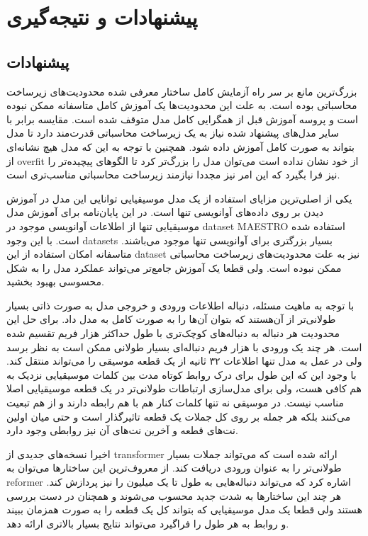 \chapter{پیشنهادات و نتیجه‌گیری}
\section{پیشنهادات}
بزرگ‌ترین مانع بر سر راه آزمایش کامل ساختار معرفی شده محدودیت‌های زیرساخت
محاسباتی بوده است. به علت این محدودیت‌ها یک آموزش کامل متاسفانه ممکن نبوده است و
پروسه آموزش قبل از همگرایی کامل مدل متوقف شده است. مقایسه برابر با سایر مدل‌های
پیشنهاد شده نیاز به یک زیرساخت محاسباتی قدرت‌مند دارد تا مدل بتواند به صورت کامل
آموزش داده شود. همچنین با توجه به این که مدل هیچ نشانه‌ای از \gls{overfit} از
خود نشان نداده است می‌توان مدل را بزرگ‌تر کرد تا الگوهای پیچیده‌تر را نیز فرا
بگیرد که این امر نیز مجددا نیازمند زیرساخت محاسباتی مناسب‌تری است.

یکی از اصلی‌ترین مزایای استفاده از یک مدل موسیقیایی توانایی این مدل در آموزش
دیدن بر روی داده‌های آوانویسی تنها است. در این پایان‌نامه برای آموزش مدل
موسیقیایی تنها از اطلاعات آوانویسی موجود در \gls{dataset} MAESTRO استفاده شده
است. با این وجود \glspl{dataset} بسیار بزرگتری برای آوانویسی تنها موجود
می‌باشند. متاسفانه امکان استفاده از این \gls{dataset} نیز به علت محدودیت‌های
زیرساخت محاسباتی ممکن نبوده است. ولی قطعا یک آموزش جامع‌تر می‌تواند عملکرد مدل
را به شکل محسوسی بهبود بخشید.

با توجه به ماهیت مسئله، دنباله اطلاعات ورودی و خروجی مدل به صورت ذاتی بسیار
طولانی‌تر از آن‌هستند که بتوان آن‌ها را به صورت کامل به مدل داد. برای حل این
محدودیت هر دنباله به دنباله‌های کوچک‌تری با طول حداکثر هزار فریم تقسیم شده است.
هر چند یک ورودی با هزار فریم دنباله‌ای بسیار طولانی ممکن است به نظر برسد ولی در
عمل به مدل تنها اطلاعات ۳۲ ثانیه از یک قطعه موسیقی را می‌تواند منتقل کند. با
وجود این که این طول برای درک روابط کوتاه مدت بین کلمات موسیقیایی نزدیک به هم
کافی هست، ولی برای مدل‌سازی ارتباطات طولانی‌تر در یک قطعه موسیقیایی اصلا مناسب
نیست. در موسیقی نه تنها کلمات کنار هم با هم رابطه دارند و از هم تبعیت می‌کنند
بلکه هر جمله بر روی کل جملات یک قطعه تاثیرگذار است و حتی میان اولین نت‌های قطعه
و آخرین نت‌های آن نیز روابطی وجود دارد.

اخیرا نسخه‌های جدیدی از \gls{transformer} ارائه شده است که می‌تواند جملات بسیار
طولانی‌تر را به عنوان ورودی دریافت کند. از معروف‌ترین این ساختارها می‌توان به
reformer \cite{kitaev2020reformer} اشاره کرد که می‌تواند دنباله‌هایی به طول تا
یک میلیون را نیز پردازش کند. هر چند این ساختارها به شدت جدید محسوب می‌شوند و
همچنان در دست بررسی هستند ولی قطعا یک مدل موسیقیایی که بتواند کل یک قطعه را به
صورت همزمان ببیند و روابط به هر طول را فراگیرد می‌تواند نتایج بسیار بالاتری
ارائه دهد.

